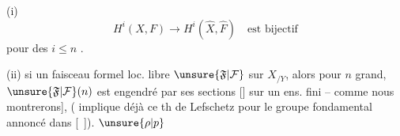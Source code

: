(i) 
\[
H^i(X,F)\longrightarrow H^i(\hat X,\hat F)
\quad\text{est bijectif}
\]
pour des  $i\leq n$
.

(ii) si un faisceau formel loc. libre
$\unsure{\mathfrak F|\mathcal F}$ sur $X_{/Y}$,
alors pour $n$ 
grand, $\unsure{\mathfrak F|\mathcal F}(n)$ est engendré
par ses sections [] sur un ens. fini --
comme nous montrerons],
( implique 
déjà ce th de Lefschetz pour le groupe fondamental annoncé dans [\ ]).
$\unsure{\rho|p}$



